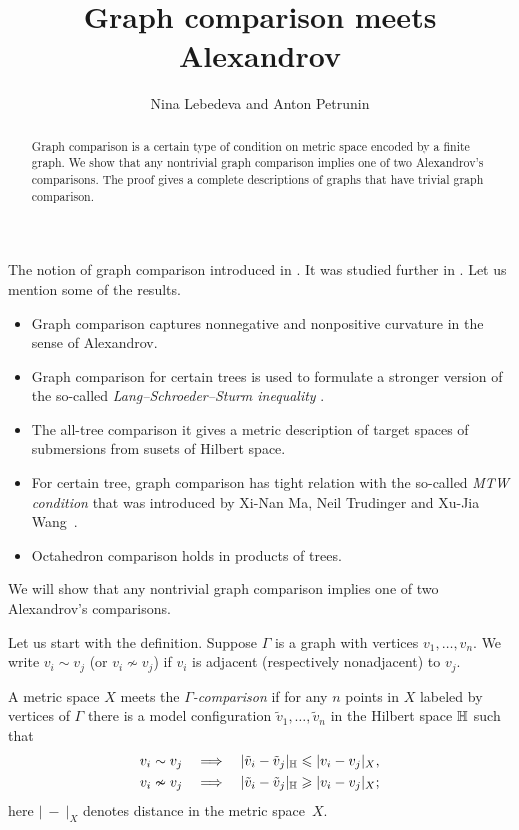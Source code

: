 \documentclass{article}
\def\thetitle{Graph comparison meets Alexandrov}
\def\theauthors{Nina Lebedeva and Anton Petrunin}
\begin{document}


\title{\thetitle}
\author{\theauthors}

\date{}
\maketitle
\begin{abstract}
Graph comparison is a certain type of condition on metric space encoded by a finite graph.
We show that any nontrivial graph comparison implies one of two Alexandrov's comparisons.
The proof gives a complete descriptions of graphs that have trivial graph comparison.
\end{abstract}

The notion of graph comparison introduced in \cite{lebedeva-petrunin-zolotov}.
It was studied further in \cite{toyoda,toyoda2019,lebedeva-petrunin-CBB,lebedeva,lebedeva-petrunin,lebedeva-petrunin-octahedron}.
Let us mention some of the results.
\begin{itemize}
\item Graph comparison captures nonnegative and nonpositive curvature in the sense of Alexandrov.
\item Graph comparison for certain trees is used to formulate a stronger version of the so-called \emph{Lang--Schroeder--Sturm inequality} \cite{lang-schroeder, sturm}.
\item The all-tree comparison it gives a metric description of target spaces of submersions from susets of Hilbert space.
\item For certain tree, graph comparison has tight relation with the so-called \emph{MTW condition} that was introduced by Xi-Nan Ma, Neil Trudinger and Xu-Jia Wang~\cite{ma-trudinger-wang}.
\item Octahedron comparison holds in products of trees.
\end{itemize}
We will show that any nontrivial graph comparison implies one of two Alexandrov's comparisons.

Let us start with the definition.
Suppose $\Gamma$ is a graph with vertices $v_1,\dots,v_n$.
We write $v_i\sim v_j$ (or $v_i\nsim v_j$) if $v_i$ is adjacent (respectively nonadjacent) to $v_j$.

A metric space $X$ meets the \emph{$\Gamma$-comparison} if for any $n$ points in $X$ labeled by vertices of $\Gamma$ there is a model configuration $\tilde v_1,\dots,\tilde v_n$ in the Hilbert space $\mathbb H$ such that 
\begin{align*}
v_i\sim v_j\quad&\Longrightarrow\quad|\tilde v_i-\tilde v_j|_{\mathbb H}\leqslant | v_i-v_j|_{X},
\\
v_i\nsim v_j\quad&\Longrightarrow\quad|\tilde v_i-\tilde v_j|_{\mathbb H}\geqslant | v_i-v_j|_{X};
\end{align*}
here $|\ -\ |_X$ denotes distance in the metric space~$X$.
\end{document}
